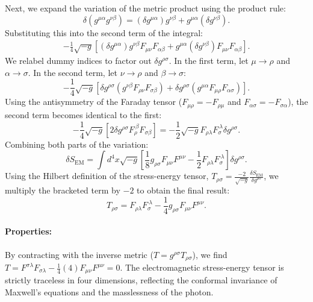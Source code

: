 \documentclass[11pt, a4paper]{report}
\begin{document}
Next, we expand the variation of the metric product using the product rule:
\begin{equation}
\delta(g^{\mu\alpha}g^{\nu\beta}) = (\delta g^{\mu\alpha})g^{\nu\beta} + g^{\mu\alpha}(\delta g^{\nu\beta}).
\end{equation}
Substituting this into the second term of the integral:
\begin{align}
-\frac{1}{4}\sqrt{-g} \left[ (\delta g^{\mu\alpha})g^{\nu\beta}F_{\mu\nu}F_{\alpha\beta} + g^{\mu\alpha}(\delta g^{\nu\beta})F_{\mu\nu}F_{\alpha\beta} \right].
\end{align}
We relabel dummy indices to factor out $\delta g^{\rho\sigma}$. In the first term, let $\mu \to \rho$ and $\alpha \to \sigma$. In the second term, let $\nu \to \rho$ and $\beta \to \sigma$:
\begin{equation}
-\frac{1}{4}\sqrt{-g} \left[ \delta g^{\rho\sigma}(g^{\nu\beta}F_{\rho\nu}F_{\sigma\beta}) + \delta g^{\rho\sigma}(g^{\mu\alpha}F_{\mu\rho}F_{\alpha\sigma}) \right].
\end{equation}
Using the antisymmetry of the Faraday tensor ($F_{\mu\rho} = -F_{\rho\mu}$ and $F_{\alpha\sigma} = -F_{\sigma\alpha}$), the second term becomes identical to the first:
\begin{equation}
-\frac{1}{4}\sqrt{-g} \left[ 2 \delta g^{\rho\sigma} F_{\rho}^{\ \beta} F_{\sigma\beta} \right] = -\frac{1}{2}\sqrt{-g} F_{\rho\lambda}F_{\sigma}^{\ \lambda} \delta g^{\rho\sigma}.
\end{equation}
Combining both parts of the variation:
\begin{equation}
\delta S_{\text{EM}} = \int d^{4}x \sqrt{-g} \left[ \frac{1}{8} g_{\rho\sigma} F_{\mu\nu}F^{\mu\nu} - \frac{1}{2} F_{\rho\lambda}F_{\sigma}^{\ \lambda} \right] \delta g^{\rho\sigma}.
\end{equation}
Using the Hilbert definition of the stress-energy tensor, $T_{\rho\sigma} = \frac{-2}{\sqrt{-g}} \frac{\delta S_{\text{EM}}}{\delta g^{\rho\sigma}}$, we multiply the bracketed term by $-2$ to obtain the final result:
\begin{equation}
\label{eq:em_tensor_derived}
T_{\rho\sigma} = F_{\rho\lambda}F_{\sigma}^{\ \lambda} - \frac{1}{4} g_{\rho\sigma} F_{\mu\nu}F^{\mu\nu}.
\end{equation}
\paragraph{Properties:} By contracting with the inverse metric ($T = g^{\rho\sigma}T_{\rho\sigma}$), we find $T = F^{\sigma\lambda}F_{\sigma\lambda} - \frac{1}{4}(4)F_{\mu\nu}F^{\mu\nu} = 0$. The electromagnetic stress-energy tensor is strictly traceless in four dimensions, reflecting the conformal invariance of Maxwell's equations and the masslessness of the photon.
\end{document}
